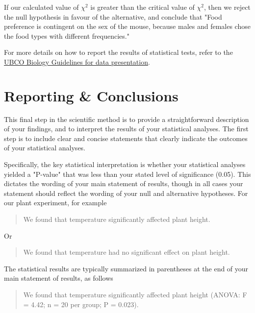\documentclass[
]{book}
\begin{document}
If our calculated value of \(\chi{^2}\) is greater than the critical value of \(\chi{^2}\), then we reject the null hypothesis in favour of the alternative, and conclude that "Food preference is contingent on the sex of the mouse, because males and females chose the food types with different frequencies."

For more details on how to report the results of statistical tests, refer to the \href{https://ubco-biology.github.io/Procedures-and-Guidelines/descriptive-summary-statistics.html}{UBCO Biology Guidelines for data presentation}.

\hypertarget{reporting-conclusions}{%
\chapter*{Reporting \& Conclusions}\label{reporting-conclusions}}

This final step in the scientific method is to provide a straightforward description of your findings, and to interpret the results of your statistical analyses. The first step is to include clear and concise statements that clearly indicate the outcomes of your statistical analyses.

Specifically, the key statistical interpretation is whether your statistical analyses yielded a "P-value" that was less than your stated level of significance (0.05). This dictates the wording of your main statement of results, though in all cases your statement should reflect the wording of your null and alternative hypotheses. For our plant experiment, for example

\begin{quote}
We found that temperature significantly affected plant height.
\end{quote}

Or

\begin{quote}
We found that temperature had no significant effect on plant height.
\end{quote}

The statistical results are typically summarized in parentheses at the end of your main statement of results, as follows

\begin{quote}
We found that temperature significantly affected plant height (ANOVA: F = 4.42; n = 20 per group; P = 0.023).
\end{quote}
\end{document}

